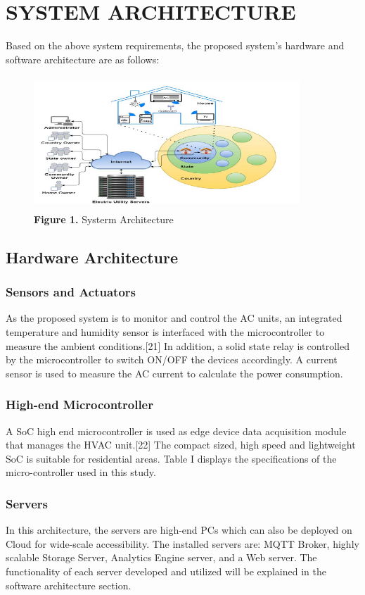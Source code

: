 \documentclass[a4paper,12pt,oneside]{article}
\let\counterwithin\relax
\begin{document}
\newpage
\section{SYSTEM ARCHITECTURE}
Based on the above system requirements, the proposed
system’s hardware and software architecture are as follows:

\begin{figure}[H]
\includegraphics[height=5cm,width=10cm]{figure1.png}
\centering
\caption{\textbf{Figure 1.} Systerm Architecture}
\end{figure}

\subsection{Hardware Architecture}
\subsubsection{Sensors and Actuators}
As the proposed system is to monitor and control the AC
units, an integrated temperature and humidity sensor is
interfaced with the microcontroller to measure the ambient
conditions.[21] In addition, a solid state relay is controlled by the microcontroller
to switch ON/OFF the devices accordingly. A
current sensor is used to measure the AC current to calculate
the power consumption.
\subsubsection{High-end Microcontroller}
A SoC high end microcontroller is used as edge device data
acquisition module that manages the HVAC unit.[22] The
compact sized, high speed and lightweight SoC is suitable for
residential areas. Table I displays the specifications of the
micro-controller used in this study.
\subsubsection{Servers}
In this architecture, the servers are high-end PCs
which can also be deployed on Cloud for wide-scale
accessibility. The installed servers are: MQTT Broker, highly
scalable Storage Server, Analytics Engine server, and a Web
server. The functionality of each server developed and utilized
will be explained in the software architecture section.
\end{document}
